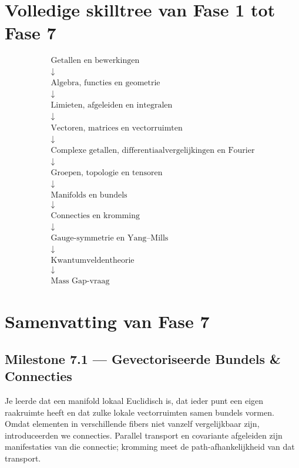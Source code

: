 \documentclass[11pt,a4paper]{article}
\begin{document}
\section{Volledige skilltree van Fase 1 tot Fase 7}

\[
\begin{array}{c}
\text{Getallen en bewerkingen}\\
\downarrow\\
\text{Algebra, functies en geometrie}\\
\downarrow\\
\text{Limieten, afgeleiden en integralen}\\
\downarrow\\
\text{Vectoren, matrices en vectorruimten}\\
\downarrow\\
\text{Complexe getallen, differentiaalvergelijkingen en Fourier}\\
\downarrow\\
\text{Groepen, topologie en tensoren}\\
\downarrow\\
\text{Manifolds en bundels}\\
\downarrow\\
\text{Connecties en kromming}\\
\downarrow\\
\text{Gauge-symmetrie en Yang--Mills}\\
\downarrow\\
\text{Kwantumveldentheorie}\\
\downarrow\\
\text{Mass Gap-vraag}
\end{array}
\]

\section{Samenvatting van Fase 7}

\subsection*{Milestone 7.1 --- Gevectoriseerde Bundels \& Connecties}
Je leerde dat een manifold lokaal Euclidisch is, dat ieder punt een eigen raakruimte heeft en dat zulke lokale vectorruimten samen bundels vormen. Omdat elementen in verschillende fibers niet vanzelf vergelijkbaar zijn, introduceerden we connecties. Parallel transport en covariante afgeleiden zijn manifestaties van die connectie; kromming meet de path-afhankelijkheid van dat transport.
\end{document}
